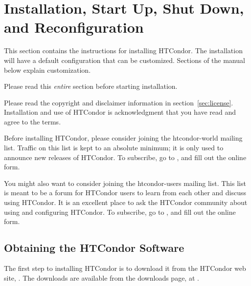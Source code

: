 \section{\label{sec:install}Installation, Start Up, Shut Down, and Reconfiguration}

This section contains the instructions for installing HTCondor.
The installation will have a default configuration that can
be customized.
Sections of the manual below explain customization.

Please read this \emph{entire} section before starting installation.

Please read the copyright and disclaimer information in
section~\ref{sec:license}.
Installation and
use of HTCondor is acknowledgment that you have read and agree to the
terms.

Before installing HTCondor, please consider joining the htcondor-world mailing
list.
Traffic on this list is kept to an absolute minimum;
it is only used to announce new releases of HTCondor.
To subscribe, go to
,
and fill out the online form.

You might also want to consider joining the htcondor-users mailing list.
This list is meant to be a forum for HTCondor users to learn from each
other and discuss using HTCondor. It is an excellent place to ask
the HTCondor community about using and configuring HTCondor.
To subscribe, go to
,
and fill out the online form.


\subsection{\label{sec:pre-install-procedure}
Obtaining the HTCondor Software}
The first step to installing HTCondor is to download it from the HTCondor
web site, .
The downloads are available from the downloads page,
at .

